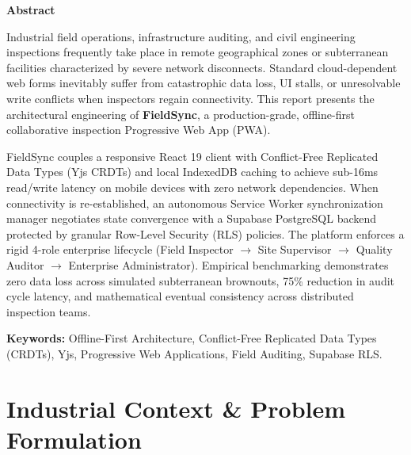 \documentclass[12pt,a4paper]{report}
\begin{document}
\begin{center}
    {\Large \textbf{Abstract}}
\end{center}
\vspace{0.5cm}

Industrial field operations, infrastructure auditing, and civil engineering inspections frequently take place in remote geographical zones or subterranean facilities characterized by severe network disconnects. Standard cloud-dependent web forms inevitably suffer from catastrophic data loss, UI stalls, or unresolvable write conflicts when inspectors regain connectivity. This report presents the architectural engineering of \textbf{FieldSync}, a production-grade, offline-first collaborative inspection Progressive Web App (PWA).

FieldSync couples a responsive React 19 client with Conflict-Free Replicated Data Types (Yjs CRDTs) and local IndexedDB caching to achieve sub-16ms read/write latency on mobile devices with zero network dependencies. When connectivity is re-established, an autonomous Service Worker synchronization manager negotiates state convergence with a Supabase PostgreSQL backend protected by granular Row-Level Security (RLS) policies. The platform enforces a rigid 4-role enterprise lifecycle (Field Inspector $\rightarrow$ Site Supervisor $\rightarrow$ Quality Auditor $\rightarrow$ Enterprise Administrator). Empirical benchmarking demonstrates zero data loss across simulated subterranean brownouts, 75\% reduction in audit cycle latency, and mathematical eventual consistency across distributed inspection teams.

\vspace{0.8cm}
\noindent \textbf{Keywords:} Offline-First Architecture, Conflict-Free Replicated Data Types (CRDTs), Yjs, Progressive Web Applications, Field Auditing, Supabase RLS.

\cleardoublepage
\tableofcontents

\cleardoublepage
{}
\setcounter{page}{1}

\chapter{Industrial Context \& Problem Formulation}
\end{document}
